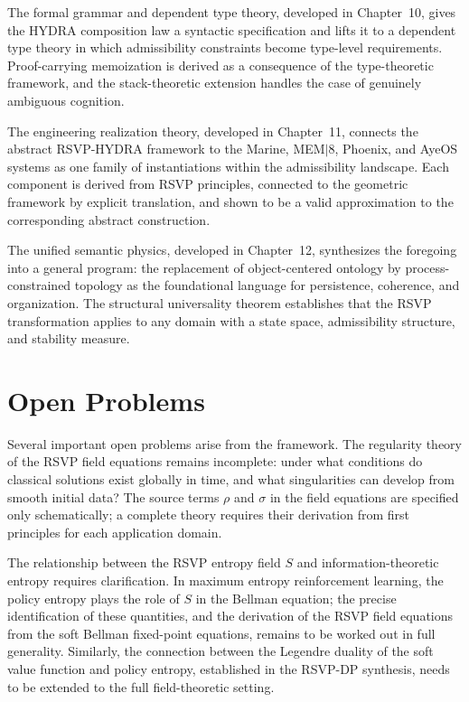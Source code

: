 \documentclass[12pt, a4paper, openany]{book}
\theoremstyle{plain}
\theoremstyle{definition}
\theoremstyle{remark}
\newcommand{\Sfield}{S}
\begin{document}
The formal grammar and dependent type theory, developed in Chapter~10, gives the HYDRA composition law a syntactic specification and lifts it to a dependent type theory in which admissibility constraints become type-level requirements. Proof-carrying memoization is derived as a consequence of the type-theoretic framework, and the stack-theoretic extension handles the case of genuinely ambiguous cognition.

The engineering realization theory, developed in Chapter~11, connects the abstract RSVP-HYDRA framework to the Marine, MEM$|$8, Phoenix, and AyeOS systems as one family of instantiations within the admissibility landscape. Each component is derived from RSVP principles, connected to the geometric framework by explicit translation, and shown to be a valid approximation to the corresponding abstract construction.

The unified semantic physics, developed in Chapter~12, synthesizes the foregoing into a general program: the replacement of object-centered ontology by process-constrained topology as the foundational language for persistence, coherence, and organization. The structural universality theorem establishes that the RSVP transformation applies to any domain with a state space, admissibility structure, and stability measure.

\section{Open Problems}

Several important open problems arise from the framework. The regularity theory of the RSVP field equations remains incomplete: under what conditions do classical solutions exist globally in time, and what singularities can develop from smooth initial data? The source terms $\rho$ and $\sigma$ in the field equations are specified only schematically; a complete theory requires their derivation from first principles for each application domain.

The relationship between the RSVP entropy field $\Sfield$ and information-theoretic entropy requires clarification. In maximum entropy reinforcement learning, the policy entropy plays the role of $\Sfield$ in the Bellman equation; the precise identification of these quantities, and the derivation of the RSVP field equations from the soft Bellman fixed-point equations, remains to be worked out in full generality. Similarly, the connection between the Legendre duality of the soft value function and policy entropy, established in the RSVP-DP synthesis, needs to be extended to the full field-theoretic setting.
\end{document}
